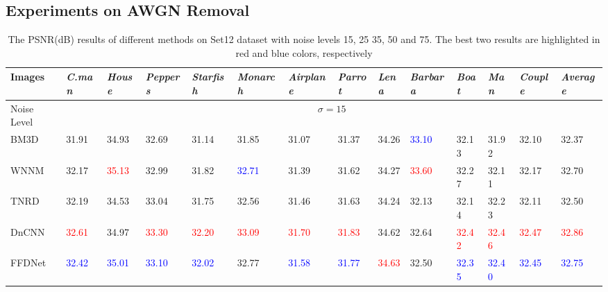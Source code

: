 \documentclass[journal]{IEEEtran}
\begin{document}
\subsection{Experiments on AWGN Removal}


\begin{table}[!htbp]\footnotesize{}
\caption{The PSNR(dB) results of different  methods on Set12 dataset with noise levels 15, 25 35, 50 and 75. The best two results are highlighted in \textcolor[rgb]{1.00,0.00,0.00}{red} and \textcolor[rgb]{0.00,0.00,1.00}{blue} colors, respectively}
\center
\begin{tabular}{|p{1.55cm}<{\centering}|p{0.8cm}<{\centering}|p{0.8cm}<{\centering}|p{0.8cm}<{\centering}|p{0.8cm}<{\centering}|p{0.8cm}<{\centering}|p{0.8cm}<{\centering}|p{0.8cm}<{\centering}|p{0.8cm}<{\centering}|p{0.8cm}<{\centering}|p{0.8cm}<{\centering}|p{0.8cm}<{\centering}|p{0.8cm}<{\centering}|p{.85cm}<{\centering}|}
  \hline\rowcolor[gray]{.9}
  Images & \scriptsize{\emph{C.man}} & \scriptsize{\emph{House}} & \scriptsize{\emph{Peppers}} & \scriptsize{\emph{Starfish}} & \scriptsize{\emph{Monarch}} &\scriptsize{\emph{Airplane}} & \scriptsize{\emph{Parrot}} & \scriptsize{\emph{Lena}} & \scriptsize{\emph{Barbara}} & \scriptsize{\emph{Boat}} & \scriptsize{\emph{Man}} & \scriptsize{\emph{Couple}} & \scriptsize{\emph{Average}} \\ \hline \hline
    Noise Level & \multicolumn{13}{c|}{$\sigma=15$}   \\ \hline
    BM3D & 31.91 & 34.93 & 32.69 & 31.14 & 31.85 & 31.07 & 31.37 & 34.26 & \textcolor{blue}{33.10} & 32.13 & 31.92 & 32.10 & 32.37  \\\hline
    WNNM& 32.17 & \textcolor{red}{35.13} & 32.99 & 31.82 & \textcolor{blue}{32.71} & 31.39 & 31.62 & 34.27 & \textcolor{red}{33.60} & 32.27 & 32.11 & 32.17 &  32.70  \\\hline
     TNRD& 32.19 & 34.53 & 33.04 & 31.75 & 32.56 & 31.46 & 31.63 & 34.24 & 32.13 & 32.14 & 32.23 & 32.11 & 32.50  \\\hline
     DnCNN& \textcolor{red}{32.61} & 34.97 & \textcolor{red}{33.30} & \textcolor{red}{32.20} & \textcolor{red}{33.09} & \textcolor{red}{31.70} & \textcolor{red}{31.83} & 34.62 & 32.64 & \textcolor{red}{32.42} & \textcolor{red}{32.46} & \textcolor{red}{32.47} &  \textcolor{red}{32.86}  \\\hline
    FFDNet & \textcolor{blue}{32.42} & \textcolor{blue}{35.01} & \textcolor{blue}{33.10} & \textcolor{blue}{32.02} & 32.77 & \textcolor{blue}{31.58} & \textcolor{blue}{31.77} & \textcolor{red}{34.63} & 32.50 & \textcolor{blue}{32.35} & \textcolor{blue}{32.40} & \textcolor{blue}{32.45} &  \textcolor{blue}{32.75}  \\\hline



\end{tabular}
\end{table}
\end{document}
